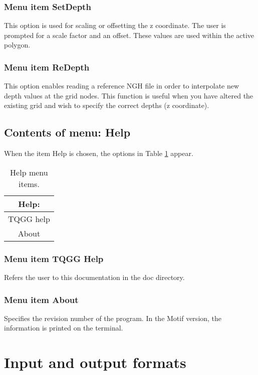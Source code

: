 \documentclass{article}
\begin{document}
\subsubsection[Menu item SetDepth]{Menu item SetDepth}
This option is used for scaling or offsetting the z coordinate. The user is prompted for a scale factor and an offset. These values are used within the active polygon.


\subsubsection[Menu item ReDepth]{Menu item ReDepth}
This option enables reading a reference NGH file in order to interpolate new depth values at the grid nodes. This function is useful when you have altered the existing grid and wish to specify the correct depths (z coordinate). 


\subsection{Contents of menu: Help}
When the item Help is chosen, the options in Table \ref{tab:HELP} appear.

\begin{table}[htb!]
 \caption{Help menu items.}
  \begin{center}
   \begin{tabular}{|c|}
    \hline
Help:\\     \hline
TQGG help \\
About \\
    \hline
   \end{tabular}
   \label{tab:HELP}
  \end{center}
\end{table}


\subsubsection[Menu item TQGG Help]{Menu item TQGG Help}
Refers the user to this documentation in the doc directory.

\subsubsection[Menu item About]{Menu item About}
Specifies the revision number of the program. In the Motif version, the information is printed on the terminal.



\section{Input and output formats} \label{sec:formats}
\end{document}
